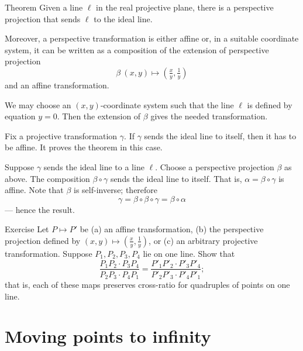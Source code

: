 \begin{thm}{Theorem}\label{thm:moving}
Given a line $\ell$ in the real projective plane, there is a perspective projection that sends $\ell$ to the ideal line.

Moreover, a perspective transformation is either affine or, in a suitable coordinate system, it can be written as a composition of the extension of perspective projection 
\[\beta\:(x,y)\mapsto (\tfrac xy,\tfrac 1y)\]
and an affine transformation.
\end{thm}

We may choose an $(x,y)$-coordinate system such that the line $\ell$ is defined by equation $y=0$.
Then the extension of $\beta$ gives the needed transformation.

Fix a projective transformation $\gamma$.
If $\gamma$ sends the ideal line to itself,
then it has to be affine. 
It proves the theorem in this case.

Suppose $\gamma$ sends the ideal line to a line $\ell$.
Choose a perspective projection $\beta$ as above.
The composition $\beta\circ\gamma$ sends the ideal line to itself.
That is, $\alpha=\beta\circ\gamma$ is affine.
Note that $\beta$ is self-inverse; therefore 
\[\gamma=\beta\circ\beta\circ\gamma=\beta\circ\alpha\]
--- hence the result.
\qeds

\begin{thm}{Exercise}\label{ex:proj-cross-ratio}
Let $P\mapsto P'$ be (a) an affine transformation, (b) the perspective projection defined by $(x,y)\mapsto (\tfrac xy,\tfrac 1y)$, or (c) an arbitrary projective transformation.
Suppose $P_1,P_2,P_3,P_4$ lie on one line.
Show that 
\[\frac{P_1P_2\cdot P_3P_4}{P_2P_3\cdot P_4P_1}=\frac{P'_1P'_2\cdot P'_3P'_4}{P'_2P'_3\cdot P'_4P'_1};\]
that is, each of these maps preserves cross-ratio for quadruples of points on one line.

\end{thm}



\section{Moving points to infinity}

